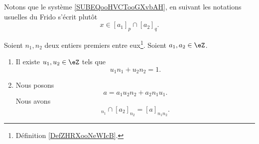 Notons que le système \eqref{SUBEQooHVCTooGXvbAH}, en suivant les notations usuelles du Frido s'écrit plutôt
\begin{equation}
	x\in [a_1]_p\cap [a_2]_q.
\end{equation}

\begin{lemma}        \label{LemCtUeGA}
	Soient \( n_1,n_2\) deux entiers premiers entre eux\footnote{Définition \ref{DefZHRXooNeWIcB}.}. Soient \( a_1, a_2\in \eZ\).
	\begin{enumerate}
		\item       \label{ITEMooZVUSooGoplQW}
		      Il existe \( u_1,u_2\in \eZ\) tels que
		      \begin{equation}        \label{EQooIJXOooNEfCBo}
			      u_1n_1+u_2n_2=1.
		      \end{equation}
		\item       \label{ITEMooFMFEooQHNLFc}
		      Nous posons
		      \begin{equation}
			      a=a_1u_2n_2+a_2n_1u_1.
		      \end{equation}
		      Nous avons
		      \begin{equation}
			      [a_1]_{n_1}\cap [a_2]_{n_2}=[a]_{n_1n_2}.
		      \end{equation}
	\end{enumerate}
\end{lemma}

